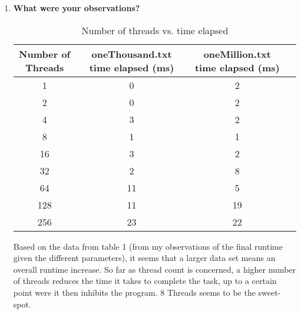 \documentclass{article}
\begin{document}
\begin{enumerate}
    \item \textbf{What were your observations?}

    \begin{table} [h]
        \centering
        \begin{tabular}{c |c c c}
            \toprule
             Number of Threads & oneThousand.txt time elapsed (ms) & oneMillion.txt time elapsed (ms)\\
             \midrule
             1 & 0 & 2\\
             2 & 0 & 2\\
             4 & 3 & 2\\
             8 & 1 & 1\\
             16 & 3 & 2\\
             32 & 2 & 8\\
             64 & 11 & 5\\
             128 & 11 & 19\\
             256 & 23 & 22\\
        \end{tabular}
        \caption{Number of threads vs. time elapsed}
        \label{tab:my_label}
    \end{table}
    Based on the data from table 1 (from my observations of the final runtime given the different parameters), it seems that a larger data set means an overall runtime increase. So far as thread count is concerned, a higher number of threads reduces the time it takes to complete the task, up to a certain point were it then inhibits the program. 8 Threads seems to be the sweet-spot.
    

\end{enumerate}
\end{document}
